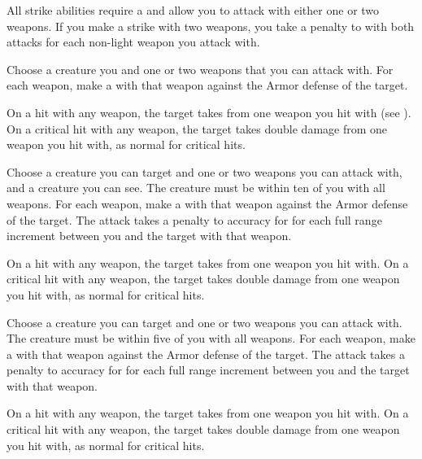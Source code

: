         \label{Two-Weapon Strikes}
        All strike abilities require a  and allow you to attack with either one or two weapons.
        If you make a strike with two weapons, you take a  penalty to  with both attacks for each non-light weapon you attack with.

        \begin{ability}{}
            Choose a creature you  and one or two  weapons that you can attack with.
            For each weapon, make a  with that weapon against the Armor defense of the target.

            On a hit with any weapon, the target takes  from one weapon you hit with (see ).
            On a critical hit with any weapon, the target takes double damage from one weapon you hit with, as normal for critical hits.
        \end{ability}

        \begin{ability}{}
            Choose a creature you can target and one or two  weapons you can attack with, and a creature you can see.
            The creature must be within ten  of you with all weapons.
            For each weapon, make a  with that weapon against the Armor defense of the target.
            The attack takes a  penalty to accuracy for for each full range increment between you and the target with that weapon.

            On a hit with any weapon, the target takes  from one weapon you hit with.
            On a critical hit with any weapon, the target takes double damage from one weapon you hit with, as normal for critical hits.
        \end{ability}

        \begin{ability}{}
            Choose a creature you can target and one or two  weapons you can attack with.
            The creature must be within five  of you with all weapons.
            For each weapon, make a  with that weapon against the Armor defense of the target.
            The attack takes a  penalty to accuracy for for each full range increment between you and the target with that weapon.

            On a hit with any weapon, the target takes  from one weapon you hit with.
            On a critical hit with any weapon, the target takes double damage from one weapon you hit with, as normal for critical hits.
        \end{ability}


